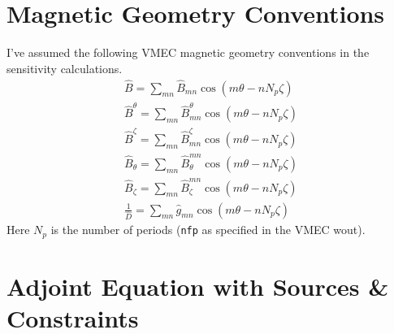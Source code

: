 \documentclass[11pt]{amsart}
\begin{document}
\section{Magnetic Geometry Conventions}

I've assumed the following VMEC magnetic geometry conventions in the sensitivity calculations.
\begin{gather}
\hat{B} = \sum_{mn} \hat{B}_{mn} \cos(m \theta - n N_p \zeta) \\
\hat{B}^{\theta} = \sum_{mn} \hat{B}^{\theta}_{mn} \cos(m \theta - n N_p \zeta) \\
\hat{B}^{\zeta} = \sum_{mn} \hat{B}^{\zeta}_{mn} \cos(m \theta - n N_p \zeta) \\ 
\hat{B}_{\theta} = \sum_{mn} \hat{B}_{\theta}^{mn} \cos(m \theta - n N_p \zeta) \\
\hat{B}_{\zeta} = \sum_{mn} \hat{B}_{\zeta}^{mn} \cos(m \theta - n N_p \zeta) \\
\frac{1}{\hat{D}} = \sum_{mn} \hat{g}_{mn} \cos(m \theta - n N_p \zeta)
\end{gather}
Here $N_p$ is the number of periods (\texttt{nfp} as specified in the VMEC wout). 

\section{Adjoint Equation with Sources \& Constraints}
\end{document}
